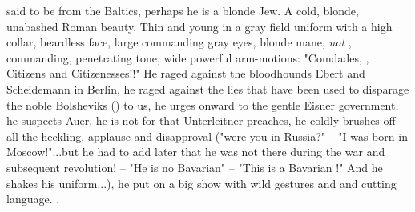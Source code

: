 said to be from the Baltics, perhaps he is a blonde Jew. A cold, blonde, unabashed Roman beauty. Thin and young in a gray field uniform with a high collar, beardless face, large commanding gray eyes, blonde mane, \textit{not} , commanding, penetrating tone, wide powerful arm-motions: "Comdades, , Citizens and Citizenesses!!" He raged against the bloodhounds Ebert and Scheidemann in Berlin, he raged against the lies that have been used to disparage the noble Bolsheviks () to us, he urges onward to the gentle Eisner government, he suspects Auer, he is not for  that Unterleitner preaches, he coldly brushes off all the heckling, applause and disapproval ("were you in Russia?" -- "I was born in Moscow!"...but he had to add later that he was not there during the war and subsequent revolution! -- "He is no Bavarian" -- "This is a Bavarian !" And he shakes his uniform...), he put on a big show with wild gestures and  and cutting language. .
